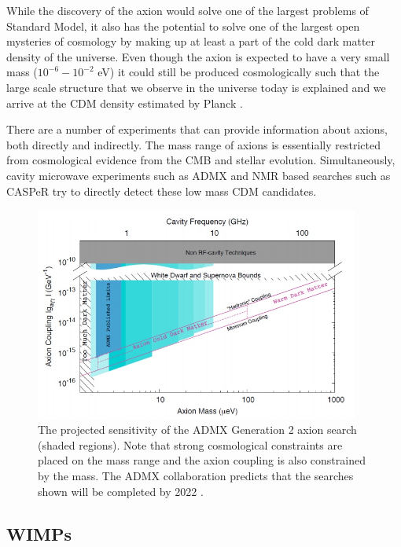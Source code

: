 While the discovery of the axion would solve one of the largest problems of Standard Model, it also has the potential to solve one of the largest open mysteries of cosmology by making up at least a part of the cold dark matter density of the universe.  Even though the axion is expected to have a very small mass ($10^{-6}-10^{-2}$ eV) it could still be produced cosmologically such that the large scale structure that we observe in the universe today is explained and we arrive at the CDM density estimated by Planck \cite{graham2015experimental}.

    There are a number of experiments that can provide information about axions, both directly and indirectly.  The mass range of axions is essentially restricted from cosmological evidence from the CMB and stellar evolution.  Simultaneously, cavity microwave experiments such as ADMX \cite{stern2016admx} and NMR based searches such as CASPeR \cite{garcon2017searching} try to directly detect these low mass CDM candidates.

\begin{figure}[t]
	\centering
	\includegraphics[width=0.95\textwidth]{admx2_limits}
	\caption{The projected sensitivity of the ADMX Generation 2 axion search (shaded regions).  Note that strong cosmological constraints are placed on the mass range and the axion coupling is also constrained by the mass.  The ADMX collaboration predicts that the searches shown will be completed by 2022 \cite{stern2016admx}.}
\end{figure}

\subsection{WIMPs}


